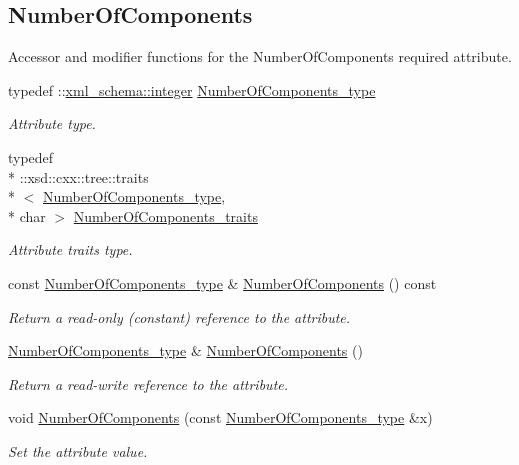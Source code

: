 \subsection*{Number\-Of\-Components}
\label{_amgrp2a0e258c3f78050b74e96bb0ed643748}%
Accessor and modifier functions for the Number\-Of\-Components required attribute. \begin{DoxyCompactItemize}
\item 
typedef \-::\hyperlink{namespacexml__schema_aaaea7c8ce4dfbe26cc52c91c29c97b7c}{xml\-\_\-schema\-::integer} \hyperlink{classDataArray__t_aac602cec132f6e771f7fa3be1d19c16f}{Number\-Of\-Components\-\_\-type}
\begin{DoxyCompactList}\small\item\em Attribute type. \end{DoxyCompactList}\item 
typedef \\*
\-::xsd\-::cxx\-::tree\-::traits\\*
$<$ \hyperlink{classDataArray__t_aac602cec132f6e771f7fa3be1d19c16f}{Number\-Of\-Components\-\_\-type}, \\*
char $>$ \hyperlink{classDataArray__t_a1112148f87db2c0ba05323377d9f0427}{Number\-Of\-Components\-\_\-traits}
\begin{DoxyCompactList}\small\item\em Attribute traits type. \end{DoxyCompactList}\item 
const \hyperlink{classDataArray__t_aac602cec132f6e771f7fa3be1d19c16f}{Number\-Of\-Components\-\_\-type} \& \hyperlink{classDataArray__t_a715a5b58a694d49499591bfea3a282ae}{Number\-Of\-Components} () const 
\begin{DoxyCompactList}\small\item\em Return a read-\/only (constant) reference to the attribute. \end{DoxyCompactList}\item 
\hyperlink{classDataArray__t_aac602cec132f6e771f7fa3be1d19c16f}{Number\-Of\-Components\-\_\-type} \& \hyperlink{classDataArray__t_a6f80fc5ce05d51d4292c698464d4ace3}{Number\-Of\-Components} ()
\begin{DoxyCompactList}\small\item\em Return a read-\/write reference to the attribute. \end{DoxyCompactList}\item 
void \hyperlink{classDataArray__t_a755fae9b31318f98a3d21beba16f2841}{Number\-Of\-Components} (const \hyperlink{classDataArray__t_aac602cec132f6e771f7fa3be1d19c16f}{Number\-Of\-Components\-\_\-type} \&x)
\begin{DoxyCompactList}\small\item\em Set the attribute value. \end{DoxyCompactList}\end{DoxyCompactItemize}
